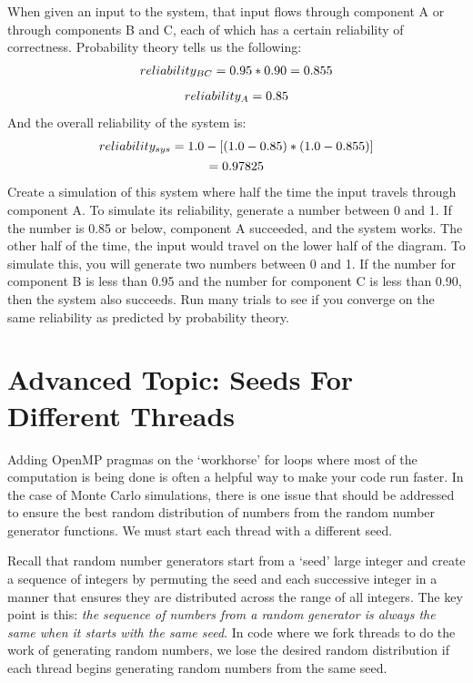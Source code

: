 \documentclass[letterpaper,10pt,openany,oneside]{sphinxmanual}
\begin{document}
When given an input to the system, that input flows through component A or through components B and C, each of which has a certain reliability of correctness.  Probability theory tells us the following:
\begin{gather}
\begin{split}reliability_{BC} = 0.95 * 0.90 = 0.855\end{split}\notag
\end{gather}\begin{gather}
\begin{split}reliability_A = 0.85\end{split}\notag
\end{gather}
And the overall reliability of the system is:
\begin{gather}
\begin{split}reliability_{sys} =  1.0 - [(1.0 - 0.85) * (1.0 - 0.855)]\end{split}\notag\\\begin{split}= 0.97825\end{split}\notag
\end{gather}
Create a simulation of this system where half the time the input travels through component A.  To simulate its reliability, generate a number between 0 and 1. If the number is 0.85 or below, component A succeeded, and the system works.  The other half of the time, the input would travel on the lower half of the diagram.  To simulate this, you will generate two numbers between 0 and 1.  If the number for component B is less than 0.95 and the number for component C is less than 0.90, then the system also succeeds.  Run many trials to see if you converge on the same reliability as predicted by probability theory.


\chapter{Advanced Topic:  Seeds For Different Threads}
\label{SeedingThreads/SeedEachThread::doc}\label{SeedingThreads/SeedEachThread:advanced-topic-seeds-for-different-threads}
Adding OpenMP pragmas on the `workhorse' for loops where most of the computation is being done is often a helpful way to make your code run faster.  In the case of Monte Carlo simulations, there is one issue that should be addressed to ensure the best random distribution of numbers from the random number generator functions.  We must start each thread with a different seed.

Recall that random number generators start from a `seed' large integer and create a sequence of integers by permuting the seed and each successive integer in a manner that ensures they are distributed across the range of all integers.  The key point is this: \emph{the sequence of numbers from a random generator is always the same when it starts with the same seed}.  In code where we fork threads to do the work of generating random numbers, we lose the desired random distribution if each thread begins generating random numbers from the same seed.
\end{document}
